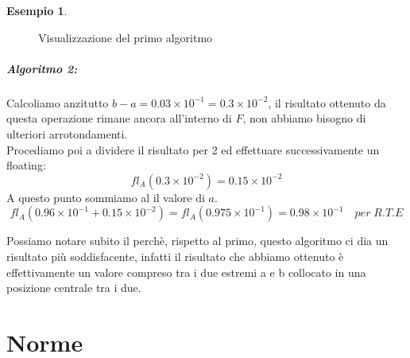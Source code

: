 \documentclass[12pt, a4paper]{book}
\theoremstyle{definition}
\newtheorem{exmp}{Esempio}[section]
\begin{document}
\begin{flushleft}
\begin{exmp}
\begin{figure}[h!]
\caption{Visualizzazione del primo algoritmo}
\label{Primo algoritmo risolutivo}
\end{figure}

\paragraph{Algoritmo 2:}
Calcoliamo anzitutto $b-a= 0.03 \times 10^{-1} = 0.3 \times 10^{-2}$, il risultato ottenuto da questa operazione rimane ancora all'interno di $F$, non abbiamo bisogno di ulteriori arrotondamenti. \\
Procediamo poi a dividere il risultato per 2 ed effettuare successivamente un floating:
\[ fl_{A}(0.3 \times 10^{-2}) = 0.15 \times 10 ^ {-2} \]
A questo punto sommiamo al il valore di $a$.
\[ fl_{A}(0.96 \times 10^{-1} + 0.15 \times 10 ^ {-2}) =  fl_{A}(0.975 \times 10^{-1}) = 0.98 \times 10^{-1} \quad per\; R.T.E\]

Possiamo notare subito il perchè, rispetto al primo, questo algoritmo ci dia un risultato più soddisfacente, infatti il risultato che abbiamo ottenuto è effettivamente un valore compreso tra i due estremi a e b collocato in una posizione centrale tra i due.
\end{exmp}
\end{flushleft}

\chapter{Norme}
\end{document}
